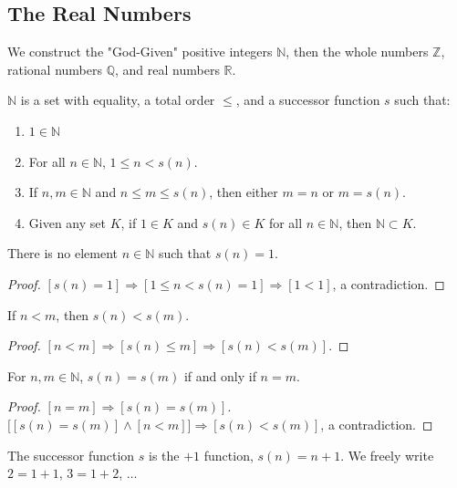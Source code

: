 \documentclass[crop=false,class=book,oneside]{standalone}
\begin{document}
        \subsection{The Real Numbers}
            We construct the "God-Given" positive integers $\mathbb{N}$, then the whole numbers $\mathbb{Z}$, rational numbers $\mathbb{Q}$, and real numbers $\mathbb{R}$.
            \begin{definition}
            $\mathbb{N}$ is a set with equality, a total order $\leq$, and a successor function $s$ such that:
            \begin{enumerate}
            \item $1\in \mathbb{N}$
            \item For all $n\in \mathbb{N}$, $1\leq n < s(n)$.
            \item If $n,m\in \mathbb{N}$ and $n\leq m \leq s(n)$, then either $m=n$ or $m=s(n)$.
            \item Given any set $K$, if $1\in K$ and $s(n)\in K$ for all $n\in \mathbb{N}$, then $\mathbb{N}\subset K$.
            \end{enumerate}
            \end{definition}
            \begin{theorem}
            There is no element $n\in \mathbb{N}$ such that $s(n) =1$.
            \end{theorem}
            \begin{proof}
            $[s(n) = 1]\Rightarrow [1\leq n < s(n)=1]\Rightarrow[1<1]$, a contradiction.
            \end{proof}
            \begin{theorem}
            If $n<m$, then $s(n)< s(m)$.
            \end{theorem}
            \begin{proof}
            $[n<m]\Rightarrow [s(n)\leq m] \Rightarrow [s(n) < s(m)]$.
            \end{proof}
            \begin{theorem}
            For $n,m\in \mathbb{N}$, $s(n)=s(m)$ if and only if $n=m$.
            \end{theorem}
            \begin{proof}
            $[n=m]\Rightarrow [s(n)=s(m)]$. $\big[[s(n)=s(m)]\land [n<m]\big] \Rightarrow [s(n)<s(m)]$, a contradiction.
            \end{proof}
            \begin{remark}
            The successor function $s$ is the $+1$ function, $s(n)=n+1$. We freely write $2=1+1$, $3=1+2$, $\hdots$
            \end{remark}
\end{document}

